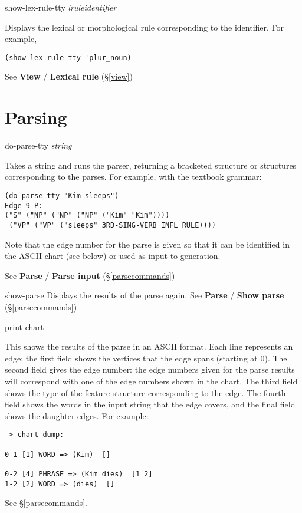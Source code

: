 \documentclass[12pt]{report}
\newcommand{\lispcommand}[1]{\noindent\rm #1}%
\newcommand{\lkbmenucommand}{\bf}
\begin{document}
\lispcommand{show-lex-rule-tty {\it lruleidentifier}}

Displays the lexical or
morphological rule corresponding to the identifier.
For example,
\begin{verbatim}
(show-lex-rule-tty 'plur_noun)
\end{verbatim}
See {\lkbmenucommand View} / {\lkbmenucommand Lexical rule} (\S\ref{view})

\section{Parsing}

\lispcommand{do-parse-tty {\it string}}

Takes a string and runs the parser, returning a bracketed 
structure or structures corresponding to the parses.
For example, with the textbook grammar:
\begin{verbatim}
(do-parse-tty "Kim sleeps")
Edge 9 P:
("S" ("NP" ("NP" ("NP" ("Kim" "Kim"))))
 ("VP" ("VP" ("sleeps" 3RD-SING-VERB_INFL_RULE))))
\end{verbatim}
Note that the edge number for the parse is given so that it
can be identified in the ASCII chart (see below) or used
as input to generation.

See {\lkbmenucommand Parse} / {\lkbmenucommand Parse input} (\S\ref{parsecommands})

\lispcommand{show-parse}
Displays the results of the parse again.
See {\lkbmenucommand Parse} / {\lkbmenucommand Show parse} (\S\ref{parsecommands})

\lispcommand{print-chart}

This shows the results of the parse in an ASCII format.
Each line represents an edge:
the first field shows the vertices that the
edge spans (starting at 0).  The second field
gives the edge number: the edge numbers given for the
parse results will correspond with one of the edge numbers
shown in the chart.  The third field shows the type of the
feature structure corresponding to the edge.
The fourth field shows the words in the input string that the
edge covers, and the final field shows the daughter edges.
For example:
\begin{verbatim}
 > chart dump:

0-1 [1] WORD => (Kim)  []

0-2 [4] PHRASE => (Kim dies)  [1 2]
1-2 [2] WORD => (dies)  []
\end{verbatim}

See \S\ref{parsecommands}.
\end{document}
